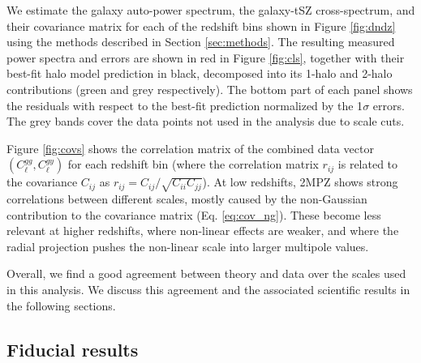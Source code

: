 \documentclass[useAMS,usenatbib]{mn2e}
\begin{document}
    We estimate the galaxy auto-power spectrum, the galaxy-tSZ cross-spectrum, and their covariance matrix for each of the redshift bins shown in Figure \ref{fig:dndz} using the methods described in Section \ref{sec:methods}. The resulting measured power spectra and errors are shown in red in Figure \ref{fig:cls}, together with their best-fit halo model prediction in black, decomposed into its 1-halo and 2-halo contributions (green and grey respectively). The bottom part of each panel shows the residuals with respect to the best-fit prediction normalized by the 1$\sigma$ errors. The grey bands cover the data points not used in the analysis due to scale cuts.
    
    Figure \ref{fig:covs} shows the correlation matrix of the combined data vector $(C^{gg}_\ell,C^{gy}_\ell)$ for each redshift bin (where the correlation matrix $r_{ij}$ is related to the covariance $C_{ij}$ as $r_{ij}=C_{ij}/\sqrt{C_{ii}C_{jj}}$). At low redshifts, 2MPZ shows strong correlations between different scales, mostly caused by the non-Gaussian contribution to the covariance matrix (Eq. \ref{eq:cov_ng}). These become less relevant at higher redshifts, where non-linear effects are weaker, and where the radial projection pushes the non-linear scale into larger multipole values.
    
    Overall, we find a good agreement between theory and data over the scales used in this analysis. We discuss this agreement and the associated scientific results in the following sections.

  \subsection{Fiducial results}\label{ssec:results.fid}  
    
\end{document}
